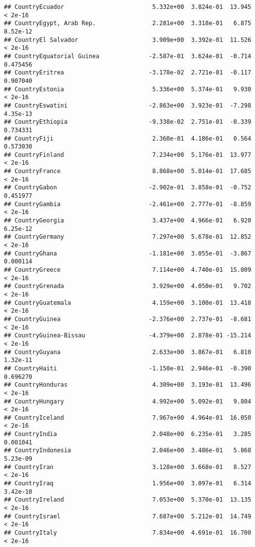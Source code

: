 \documentclass[
]{article}
\begin{document}
\begin{verbatim}
## CountryEcuador                         5.332e+00  3.824e-01  13.945  < 2e-16
## CountryEgypt, Arab Rep.                2.281e+00  3.318e-01   6.875 8.52e-12
## CountryEl Salvador                     3.909e+00  3.392e-01  11.526  < 2e-16
## CountryEquatorial Guinea              -2.587e-01  3.624e-01  -0.714 0.475456
## CountryEritrea                        -3.178e-02  2.721e-01  -0.117 0.907040
## CountryEstonia                         5.336e+00  5.374e-01   9.930  < 2e-16
## CountryEswatini                       -2.863e+00  3.923e-01  -7.298 4.35e-13
## CountryEthiopia                       -9.338e-02  2.751e-01  -0.339 0.734331
## CountryFiji                            2.360e-01  4.186e-01   0.564 0.573030
## CountryFinland                         7.234e+00  5.176e-01  13.977  < 2e-16
## CountryFrance                          8.868e+00  5.014e-01  17.685  < 2e-16
## CountryGabon                          -2.902e-01  3.858e-01  -0.752 0.451977
## CountryGambia                         -2.461e+00  2.777e-01  -8.859  < 2e-16
## CountryGeorgia                         3.437e+00  4.966e-01   6.920 6.25e-12
## CountryGermany                         7.297e+00  5.678e-01  12.852  < 2e-16
## CountryGhana                          -1.181e+00  3.055e-01  -3.867 0.000114
## CountryGreece                          7.114e+00  4.740e-01  15.009  < 2e-16
## CountryGrenada                         3.929e+00  4.050e-01   9.702  < 2e-16
## CountryGuatemala                       4.159e+00  3.100e-01  13.418  < 2e-16
## CountryGuinea                         -2.376e+00  2.737e-01  -8.681  < 2e-16
## CountryGuinea-Bissau                  -4.379e+00  2.878e-01 -15.214  < 2e-16
## CountryGuyana                          2.633e+00  3.867e-01   6.810 1.32e-11
## CountryHaiti                          -1.150e-01  2.946e-01  -0.390 0.696270
## CountryHonduras                        4.309e+00  3.193e-01  13.496  < 2e-16
## CountryHungary                         4.992e+00  5.092e-01   9.804  < 2e-16
## CountryIceland                         7.967e+00  4.964e-01  16.050  < 2e-16
## CountryIndia                           2.048e+00  6.235e-01   3.285 0.001041
## CountryIndonesia                       2.046e+00  3.486e-01   5.868 5.23e-09
## CountryIran                            3.128e+00  3.668e-01   8.527  < 2e-16
## CountryIraq                            1.956e+00  3.097e-01   6.314 3.42e-10
## CountryIreland                         7.053e+00  5.370e-01  13.135  < 2e-16
## CountryIsrael                          7.687e+00  5.212e-01  14.749  < 2e-16
## CountryItaly                           7.834e+00  4.691e-01  16.700  < 2e-16

\end{verbatim}
\end{document}
